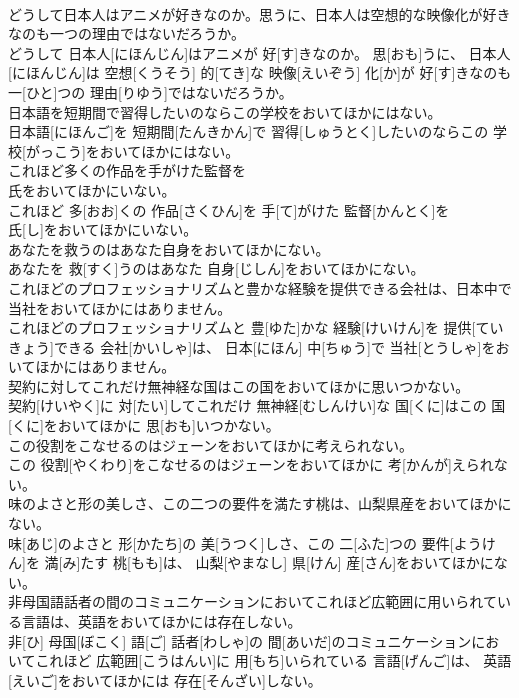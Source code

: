 \documentclass[8pt]{extreport}
\begin{document}
\begin{CJK}{UTF8}{min}
\\	どうして日本人はアニメが好きなのか。思うに、日本人は空想的な映像化が好きなのも一つの理由ではないだろうか。	
\\	どうして 日本人[にほんじん]はアニメが 好[す]きなのか。 思[おも]うに、 日本人[にほんじん]は 空想[くうそう] 的[てき]な 映像[えいぞう] 化[か]が 好[す]きなのも 一[ひと]つの 理由[りゆう]ではないだろうか。
\\	日本語を短期間で習得したいのならこの学校をおいてほかにはない。	
\\	日本語[にほんご]を 短期間[たんきかん]で 習得[しゅうとく]したいのならこの 学校[がっこう]をおいてほかにはない。
\\	これほど多くの作品を手がけた監督を
\\	氏をおいてほかにいない。	
\\	これほど 多[おお]くの 作品[さくひん]を 手[て]がけた 監督[かんとく]を 
\\	氏[し]をおいてほかにいない。
\\	あなたを救うのはあなた自身をおいてほかにない。	
\\	あなたを 救[すく]うのはあなた 自身[じしん]をおいてほかにない。
\\	これほどのプロフェッショナリズムと豊かな経験を提供できる会社は、日本中で当社をおいてほかにはありません。	
\\	これほどのプロフェッショナリズムと 豊[ゆた]かな 経験[けいけん]を 提供[ていきょう]できる 会社[かいしゃ]は、 日本[にほん] 中[ちゅう]で 当社[とうしゃ]をおいてほかにはありません。
\\	契約に対してこれだけ無神経な国はこの国をおいてほかに思いつかない。	
\\	契約[けいやく]に 対[たい]してこれだけ 無神経[むしんけい]な 国[くに]はこの 国[くに]をおいてほかに 思[おも]いつかない。
\\	この役割をこなせるのはジェーンをおいてほかに考えられない。	
\\	この 役割[やくわり]をこなせるのはジェーンをおいてほかに 考[かんが]えられない。
\\	味のよさと形の美しさ、この二つの要件を満たす桃は、山梨県産をおいてほかにない。	
\\	味[あじ]のよさと 形[かたち]の 美[うつく]しさ、この 二[ふた]つの 要件[ようけん]を 満[み]たす 桃[もも]は、 山梨[やまなし] 県[けん] 産[さん]をおいてほかにない。
\\	非母国語話者の間のコミュニケーションにおいてこれほど広範囲に用いられている言語は、英語をおいてほかには存在しない。	
\\	非[ひ] 母国[ぼこく] 語[ご] 話者[わしゃ]の 間[あいだ]のコミュニケーションにおいてこれほど 広範囲[こうはんい]に 用[もち]いられている 言語[げんご]は、 英語[えいご]をおいてほかには 存在[そんざい]しない。

\end{CJK}
\end{document}
